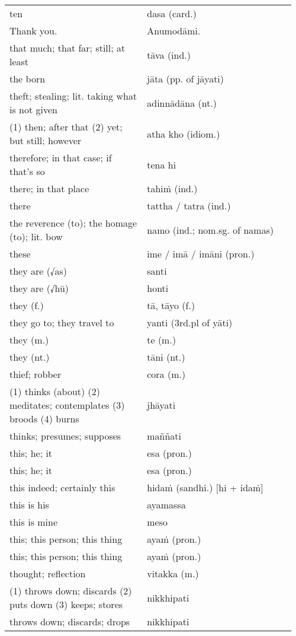 \documentclass[a5paper]{memoir}
\begin{document}
\begin{longtable}{L{0.48\linewidth} L{0.48\linewidth} H}
ten & dasa (card.) & \\[0pt]
Thank you. & Anumodāmi. & \\[0pt]
that much; that far; still; at least & tāva (ind.) & \\[0pt]
the born & jāta (pp. of jāyati) & \\[0pt]
theft; stealing; lit. taking what is not given & adinnādāna (nt.) & \\[0pt]
(1) then; after that (2) yet; but still; however & atha kho (idiom.) & \\[0pt]
therefore; in that case; if that's so & tena hi & \\[0pt]
there; in that place & tahiṁ (ind.) & \\[0pt]
there & tattha / tatra (ind.) & \\[0pt]
the reverence (to); the homage (to); lit. bow & namo (ind.; nom.sg. of namas) & \\[0pt]
these & ime / imā / imāni (pron.) & \\[0pt]
they are (√as) & santi & \\[0pt]
they are (√hū) & honti & \\[0pt]
they (f.) & tā, tāyo (f.) & \\[0pt]
they go to; they travel to & yanti (3rd.pl of yāti) & \\[0pt]
they (m.) & te (m.) & \\[0pt]
they (nt.) & tāni (nt.) & \\[0pt]
thief; robber & cora (m.) & \\[0pt]
(1) thinks (about) (2) meditates; contemplates (3) broods (4) burns & jhāyati & \\[0pt]
thinks; presumes; supposes & maññati & \\[0pt]
this; he; it & esa (pron.) & \\[0pt]
this; he; it & esa (pron.) & \\[0pt]
this indeed; certainly this & hidaṁ (sandhi.) [hi + idaṁ] & \\[0pt]
this is his & ayamassa & \\[0pt]
this is mine & meso & \\[0pt]
this; this person; this thing & ayaṁ (pron.) & \\[0pt]
this; this person; this thing & ayaṁ (pron.) & \\[0pt]
thought; reflection & vitakka (m.) & \\[0pt]
(1) throws down; discards (2) puts down (3) keeps; stores & nikkhipati & \\[0pt]
throws down; discards; drops & nikkhipati & \\[0pt]

\end{longtable}
\end{document}
